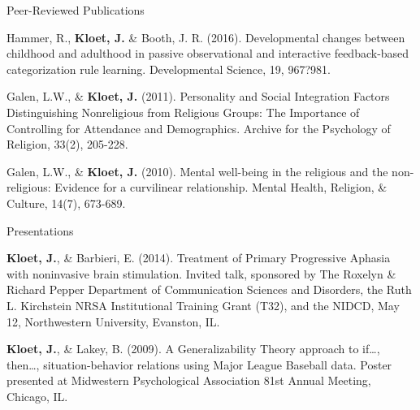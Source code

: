 \vspace{4.0mm}
\begin{cventries}

\cventry
    {} %
    {Peer-Reviewed Publications} %
    {} %
    {} %
    {
      \vspace{-4mm}
      \begin{cvitems} %
       \item {Hammer, R., \textbf{Kloet, J.} \& Booth, J. R. (2016). Developmental changes between childhood and adulthood in passive observational and interactive feedback-based categorization rule learning. Developmental Science, 19, 967?981.}
        \item {Galen, L.W., \& \textbf{Kloet, J.} (2011). Personality and Social Integration Factors Distinguishing Nonreligious from Religious Groups: The Importance of Controlling for Attendance and Demographics. Archive for the Psychology of Religion, 33(2), 205-228.}
        \item {Galen, L.W., \& \textbf{Kloet, J.} (2010). Mental well-being in the religious and the non-religious: Evidence for a curvilinear relationship. Mental Health, Religion, \& Culture, 14(7), 673-689.}
      \end{cvitems}
    }

  \cventry
    {} %
    {Presentations} %
    {} %
    {} %
    {
      \vspace{-4mm}
      \begin{cvitems} %
        \item {{\textbf{Kloet, J.}}, \& Barbieri, E. (2014). Treatment of Primary Progressive Aphasia with noninvasive brain stimulation. Invited talk, sponsored by The Roxelyn \& Richard Pepper Department of Communication Sciences and Disorders, the Ruth L. Kirchstein NRSA Institutional Training Grant (T32), and the NIDCD, May 12, Northwestern University, Evanston, IL. }
        \item {{\textbf{Kloet, J.}}, \& Lakey, B. (2009). A Generalizability Theory approach to if\dots, then\dots, situation-behavior relations using Major League Baseball data. Poster presented at Midwestern Psychological Association 81st Annual Meeting, Chicago, IL.}
      \end{cvitems}
    }
\end{cventries}
